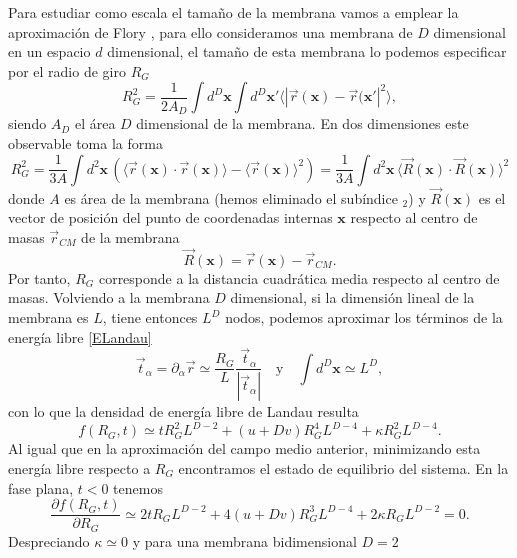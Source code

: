 Para estudiar como escala el tamaño de la membrana vamos a emplear la
aproximación de Flory \cite{Gennes:Scaling}, para ello consideramos una
membrana de $D$ dimensional en un espacio 
$d$ dimensional, el tamaño de esta membrana lo podemos especificar por el
radio de giro $R_G$
\begin{equation*}
R_G^2=\frac{1}{2A_D}\int d^D\mathbf{x}\int d^D\mathbf{x}' \langle |
\vec{r}(\mathbf{x})-\vec{r}(\mathbf{x}'|^2\rangle, 
\end{equation*}
siendo $A_D$ el área $D$ dimensional de la membrana. En dos dimensiones este
observable toma la forma
\begin{equation*}
R_G^2=\frac{1}{3A}\int d^2\mathbf{x}\, (\langle
\vec{r}(\mathbf{x})\cdot\vec{r}(\mathbf{x})\rangle-\langle
\vec{r}(\mathbf{x})\rangle^2)=\frac{1}{3A}\int d^2\mathbf{x}\, \langle
\vec{R}(\mathbf{x})\cdot\vec{R}(\mathbf{x})\rangle^2
\end{equation*} 
donde $A$ es área de la membrana (hemos eliminado el subíndice $_2$) y
$\vec{R}(\mathbf{x})$ es el vector de posición del punto de coordenadas
internas $\mathbf{x}$ respecto al centro de masas $\vec{r}_{CM}$ de la
membrana
\begin{equation*}
\vec{R}(\mathbf{x})=\vec{r}(\mathbf{x})-\vec{r}_{CM}.
\end{equation*}
Por tanto, $R_G$ corresponde a la distancia cuadrática media respecto al
centro de masas. Volviendo a la membrana $D$ dimensional, si la dimensión
lineal de la membrana es $L$, tiene entonces $L^D$ nodos, podemos
aproximar los términos \cite{David:normal,Gomper:triangulated} de la energía libre \eqref{ELandau}  
\begin{equation*}
\vec{t}_{\alpha}=\partial_{\alpha} \vec{r}\simeq \frac{R_G}{L}
\frac{\vec{t}_{\alpha}}{|\vec{t}_{\alpha}|}\quad \text{y}\quad \int
d^D\mathbf{x}\simeq L^D,
\end{equation*}
con lo que la densidad de energía libre de Landau resulta
\begin{equation*}
f(R_G,t)\simeq t R_G^2 L^{D-2}+(u+Dv) R_G^4 L^{D-4}+\kappa R_G^2 L^{D-4}.
\end{equation*}
Al igual que en la aproximación del campo medio anterior, minimizando esta
energía libre respecto a $R_G$ encontramos el estado de equilibrio del sistema. En la fase
plana, $t<0$ tenemos
\begin{equation*}
\frac{\partial f(R_G,t)}{\partial R_G}\simeq 2t R_G L^{D-2}+4(u+Dv) R_G^3
L^{D-4}+2 \kappa R_G L^{D-2}=0.
\end{equation*}
Despreciando $\kappa\simeq 0$ y para una membrana bidimensional $D=2$
